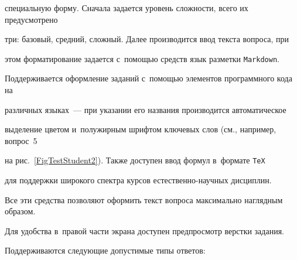специальную форму. Сначала задается уровень сложности, всего их преду\-смот\-ре\-но 


три: базовый, средний, сложный. Далее производится ввод текста вопроса, при 


этом форматирование задается с~по\-мощью средств язык разметки \verb"Markdown". 


Поддерживается оформление заданий с~по\-мощью элементов программного кода на 


различных языках~--- при указании его названия производится автоматическое 


выделение цветом и~полужирным шрифтом ключевых слов (см., например, вопрос~5 


на рис.~\ref{FigTestStudent2}). Также доступен ввод формул в~формате \verb"TeX" 


для поддержки широкого спектра курсов естественно-научных дисциплин. 


Все эти средства позволяют оформить текст вопроса максимально наглядным образом. 


Для удобства в~правой части экрана доступен предпросмотр верстки за\-дания.


{





}





Поддерживаются следующие допустимые типы ответов:


